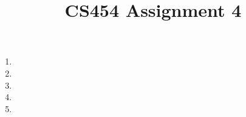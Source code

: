 \documentclass[12pt]{article}
\title{CS454 Assignment 4}
\begin{document}
\maketitle
\begin{enumerate}[{\bf Q1}]
\item
\item
\item
\item
\item
\end{enumerate}
\end{document}
